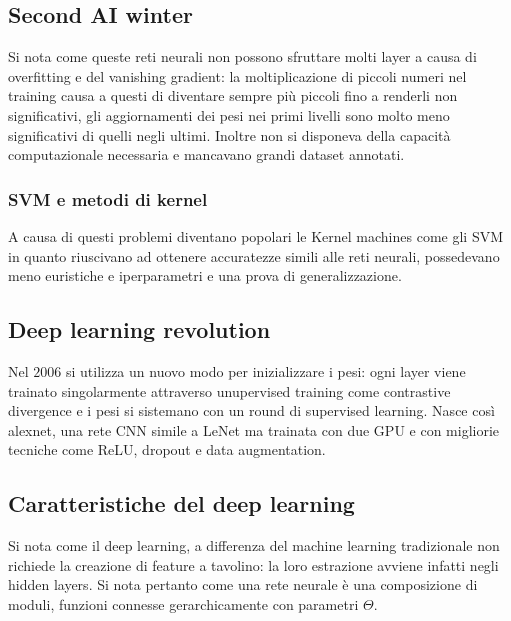 	\subsection{Second AI winter}
	Si nota come queste reti neurali non possono sfruttare molti layer a causa di overfitting e del vanishing gradient: la moltiplicazione di piccoli numeri nel training causa a questi di diventare sempre pi\`u piccoli fino a renderli non significativi, gli aggiornamenti dei pesi nei primi livelli sono molto meno significativi di quelli negli ultimi.
	Inoltre non si disponeva della capacit\`a computazionale necessaria e mancavano grandi dataset annotati.

		\subsubsection{SVM e metodi di kernel}
		A causa di questi problemi diventano popolari le Kernel machines come gli SVM in quanto riuscivano ad ottenere accuratezze simili alle reti neurali, possedevano meno euristiche e iperparametri e una prova di generalizzazione.

	\subsection{Deep learning revolution}
	Nel $2006$ si utilizza un nuovo modo per inizializzare i pesi: ogni layer viene trainato singolarmente attraverso unupervised training come contrastive divergence e i pesi si sistemano con un round di supervised learning.
	Nasce cos\`i alexnet, una rete CNN simile a LeNet ma trainata con due GPU e con migliorie tecniche come ReLU, dropout e data augmentation.

	\subsection{Caratteristiche del deep learning}
	Si nota come il deep learning, a differenza del machine learning tradizionale non richiede la creazione di feature a tavolino: la loro estrazione avviene infatti negli hidden layers.
	Si nota pertanto come una rete neurale \`e una composizione di moduli, funzioni connesse gerarchicamente con parametri $\Theta$.

